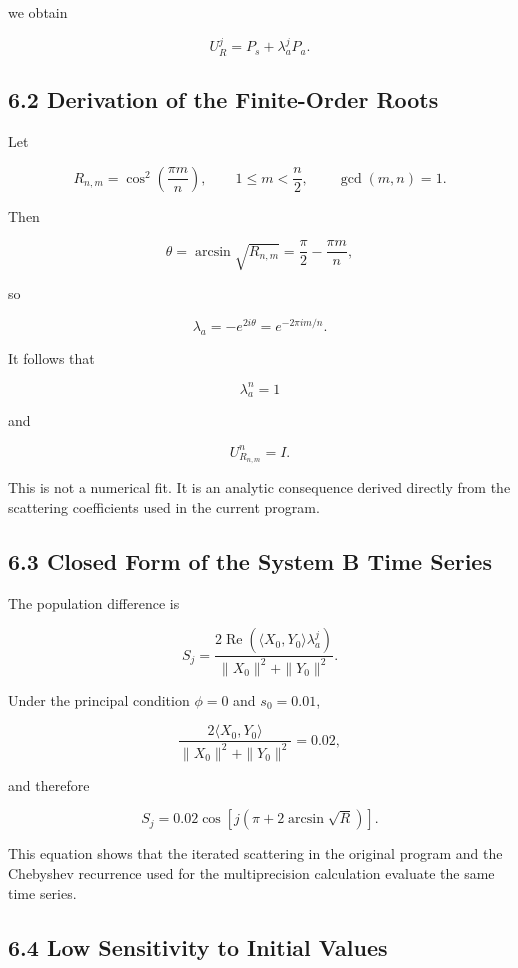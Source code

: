 \documentclass[
  10pt,
  a4paper,
]{article}
\begin{document}
we obtain

\[
\boxed{
U_R^j=P_s+\lambda_a^jP_a
}.
\]

\subsection{6.2 Derivation of the Finite-Order
Roots}\label{derivation-of-the-finite-order-roots}

Let

\[
R_{n,m}
=\cos^2\left(\frac{\pi m}{n}\right),
\qquad
1\le m<\frac n2,
\qquad
\gcd(m,n)=1.
\]

Then

\[
\theta
=\arcsin\sqrt{R_{n,m}}
=\frac{\pi}{2}-\frac{\pi m}{n},
\]

so

\[
\lambda_a
=-e^{2i\theta}
=e^{-2\pi i m/n}.
\]

It follows that

\[
\lambda_a^n=1
\]

and

\[
\boxed{
U_{R_{n,m}}^n=I
}.
\]

This is not a numerical fit. It is an analytic consequence derived
directly from the scattering coefficients used in the current program.

\subsection{6.3 Closed Form of the System B Time
Series}\label{closed-form-of-the-system-b-time-series}

The population difference is

\[
S_j=
\frac{2\operatorname{Re}
\left(
\langle X_0,Y_0\rangle\lambda_a^j
\right)}
{\|X_0\|^2+\|Y_0\|^2}.
\]

Under the principal condition \(\phi=0\) and \(s_0=0.01\),

\[
\frac{2\langle X_0,Y_0\rangle}
{\|X_0\|^2+\|Y_0\|^2}
=0.02,
\]

and therefore

\[
\boxed{
S_j
=0.02\cos\left[
j\left(
\pi+2\arcsin\sqrt R
\right)
\right]
}.
\]

This equation shows that the iterated scattering in the original program
and the Chebyshev recurrence used for the multiprecision calculation
evaluate the same time series.

\subsection{6.4 Low Sensitivity to Initial
Values}\label{low-sensitivity-to-initial-values}
\end{document}
